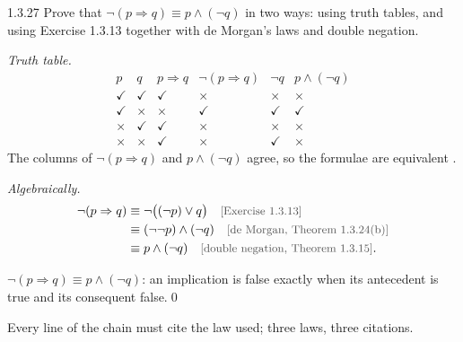 \begin{bookex}[essential]{1.3.27}
Prove that $\neg(p\Rightarrow q)\equiv p\wedge(\neg q)$ in two ways: using truth tables, and using Exercise 1.3.13 together with de Morgan's laws and double negation.
\solution
\begin{steps}
\item \emph{Truth table.}
\[
\begin{array}{cc|cc|cc}
p&q&p\Rightarrow q&\neg(p\Rightarrow q)&\neg q&p\wedge(\neg q)\\\hline
\checkmark&\checkmark&\checkmark&\times&\times&\times\\
\checkmark&\times&\times&\checkmark&\checkmark&\checkmark\\
\times&\checkmark&\checkmark&\times&\times&\times\\
\times&\times&\checkmark&\times&\checkmark&\times
\end{array}
\]
The columns of $\neg(p\Rightarrow q)$ and $p\wedge(\neg q)$ agree, so the formulae are equivalent .
\item \emph{Algebraically.}
\begin{align*}
\neg(p\Rightarrow q)&\equiv\neg\big((\neg p)\vee q\big)\why{Exercise 1.3.13}\\
&\equiv(\neg\neg p)\wedge(\neg q)\why{de Morgan, Theorem 1.3.24(b)}\\
&\equiv p\wedge(\neg q)\why{double negation, Theorem 1.3.15}.
\end{align*}
\end{steps}
\conclusion $\neg(p\Rightarrow q)\equiv p\wedge(\neg q)$: an implication is false exactly when its antecedent is true and its consequent false.\qed
\begin{compare}
\item Every line of the chain must cite the law used; three laws, three citations.
\end{compare}
\end{bookex}


